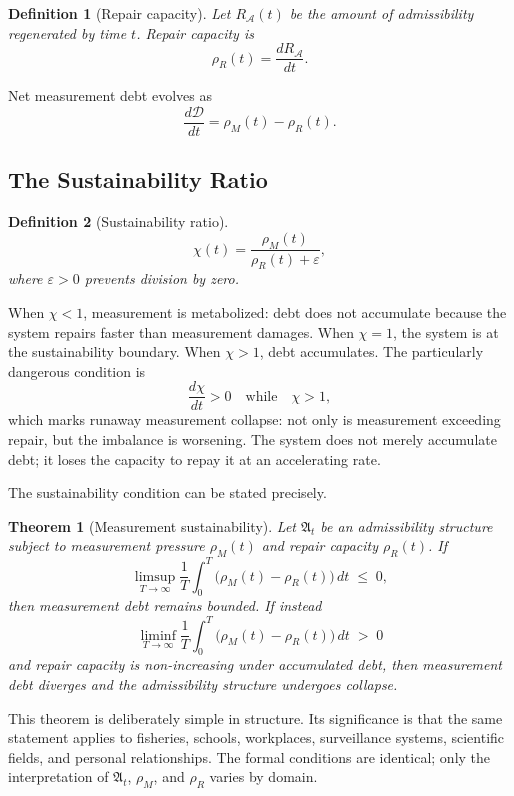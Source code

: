 \documentclass[12pt, a4paper]{article}
\theoremstyle{flyxion}
\newtheorem{theorem}{Theorem}
\newtheorem{definition}{Definition}
\newcommand{\fA}{\mathfrak{A}}
\newcommand{\cA}{\mathcal{A}}
\newcommand{\cD}{\mathcal{D}}
\newcommand{\rhoM}{\rho_{M}}
\newcommand{\rhoR}{\rho_{R}}
\begin{document}
\begin{definition}[Repair capacity]
Let $R_\cA(t)$ be the amount of admissibility regenerated by time $t$. Repair capacity is
\[
  \rhoR(t) = \frac{dR_\cA}{dt}.
\]
\end{definition}

Net measurement debt evolves as
\[
  \frac{d\cD}{dt} = \rhoM(t) - \rhoR(t).
\]

\subsection*{The Sustainability Ratio}

\begin{definition}[Sustainability ratio]
\[
  \chi(t) = \frac{\rhoM(t)}{\rhoR(t) + \varepsilon},
\]
where $\varepsilon > 0$ prevents division by zero.
\end{definition}

When $\chi < 1$, measurement is metabolized: debt does not accumulate because the system repairs faster than measurement damages. When $\chi = 1$, the system is at the sustainability boundary. When $\chi > 1$, debt accumulates. The particularly dangerous condition is
\[
  \frac{d\chi}{dt} > 0 \quad \text{while} \quad \chi > 1,
\]
which marks runaway measurement collapse: not only is measurement exceeding repair, but the imbalance is worsening. The system does not merely accumulate debt; it loses the capacity to repay it at an accelerating rate.

The sustainability condition can be stated precisely.

\begin{theorem}[Measurement sustainability]
Let $\fA_t$ be an admissibility structure subject to measurement pressure $\rhoM(t)$ and repair capacity $\rhoR(t)$. If
\[
  \limsup_{T\to\infty} \frac{1}{T} \int_0^T \bigl(\rhoM(t) - \rhoR(t)\bigr)\, dt \;\leq\; 0,
\]
then measurement debt remains bounded. If instead
\[
  \liminf_{T\to\infty} \frac{1}{T} \int_0^T \bigl(\rhoM(t) - \rhoR(t)\bigr)\, dt \;>\; 0
\]
and repair capacity is non-increasing under accumulated debt, then measurement debt diverges and the admissibility structure undergoes collapse.
\end{theorem}

This theorem is deliberately simple in structure. Its significance is that the same statement applies to fisheries, schools, workplaces, surveillance systems, scientific fields, and personal relationships. The formal conditions are identical; only the interpretation of $\fA_t$, $\rhoM$, and $\rhoR$ varies by domain.
\end{document}
